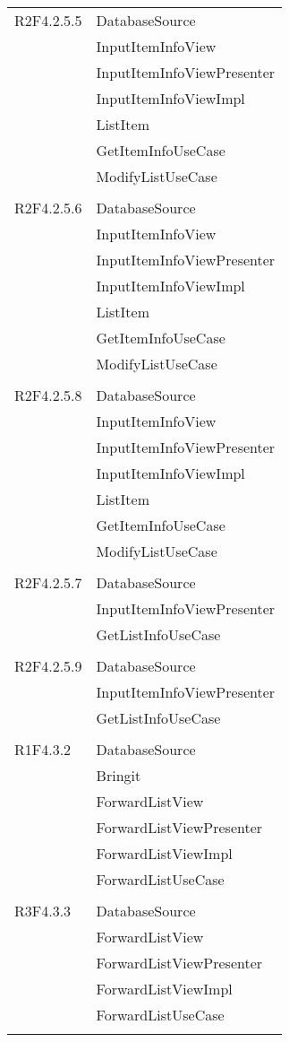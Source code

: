 \begin{center}
\begin{longtable}{|p{7cm}|p{7cm}|}
		R2F4.2.5.5 & DatabaseSource \\ & InputItemInfoView \\ & InputItemInfoViewPresenter \\ & InputItemInfoViewImpl \\ & ListItem \\ & GetItemInfoUseCase \\ & ModifyListUseCase \\ & \\ \hline
		R2F4.2.5.6 & DatabaseSource \\ & InputItemInfoView \\ & InputItemInfoViewPresenter \\ & InputItemInfoViewImpl \\ & ListItem \\ & GetItemInfoUseCase \\ & ModifyListUseCase \\ & \\ \hline
		R2F4.2.5.8 & DatabaseSource \\ & InputItemInfoView \\ & InputItemInfoViewPresenter \\ & InputItemInfoViewImpl \\ & ListItem \\ & GetItemInfoUseCase \\ & ModifyListUseCase \\ & \\ \hline
		R2F4.2.5.7 & DatabaseSource \\ & InputItemInfoViewPresenter \\ & GetListInfoUseCase \\ & \\ \hline
		R2F4.2.5.9 & DatabaseSource \\ & InputItemInfoViewPresenter \\ & GetListInfoUseCase \\ & \\ \hline
		R1F4.3.2 & DatabaseSource \\ & Bringit \\ & ForwardListView \\ & ForwardListViewPresenter \\ & ForwardListViewImpl \\ & ForwardListUseCase \\ & \\ \hline
		R3F4.3.3 & DatabaseSource \\ & ForwardListView \\ & ForwardListViewPresenter \\ & ForwardListViewImpl \\ & ForwardListUseCase \\ & \\ \hline

\end{longtable}
\end{center}
